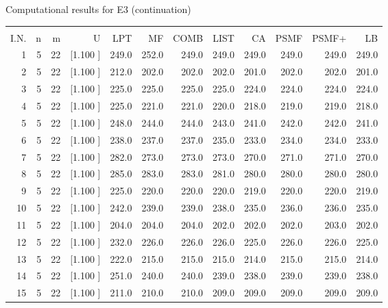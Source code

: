 \documentclass[12pt,a4paper]{article}
\begin{document}
\newpage
\begin{center}
 Computational results for E3 (continuation) {\tiny
\begin{tabular}{r r r r r r r r r r r r}\hline
    &   &   &          &        &        &        &        &        &        &        &       \\[-0.1in]
  I.N.  &  n  &  m  &  U  &  LPT  &  MF  &  COMB  &  LIST  &  CA  & PSMF &PSMF+ & LB \\[0.03in]
\hline
   1&  5& 22&[1.100     ]&   249.0&   252.0&   249.0&   249.0&   249.0&   249.0&   249.0&   249.0\\[-0.02in]
   2&  5& 22&[1.100     ]&   212.0&   202.0&   202.0&   202.0&   201.0&   202.0&   202.0&   201.0\\[-0.02in]
   3&  5& 22&[1.100     ]&   225.0&   225.0&   225.0&   225.0&   224.0&   224.0&   224.0&   224.0\\[-0.02in]
   4&  5& 22&[1.100     ]&   225.0&   221.0&   221.0&   220.0&   218.0&   219.0&   219.0&   218.0\\[-0.02in]
   5&  5& 22&[1.100     ]&   248.0&   244.0&   244.0&   243.0&   241.0&   242.0&   242.0&   241.0\\[-0.02in]
   6&  5& 22&[1.100     ]&   238.0&   237.0&   237.0&   235.0&   233.0&   234.0&   234.0&   233.0\\[-0.02in]
   7&  5& 22&[1.100     ]&   282.0&   273.0&   273.0&   273.0&   270.0&   271.0&   271.0&   270.0\\[-0.02in]
   8&  5& 22&[1.100     ]&   285.0&   283.0&   283.0&   281.0&   280.0&   280.0&   280.0&   280.0\\[-0.02in]
   9&  5& 22&[1.100     ]&   225.0&   220.0&   220.0&   220.0&   219.0&   220.0&   220.0&   219.0\\[-0.02in]
  10&  5& 22&[1.100     ]&   242.0&   239.0&   239.0&   238.0&   235.0&   236.0&   236.0&   235.0\\[-0.02in]
  11&  5& 22&[1.100     ]&   204.0&   204.0&   204.0&   202.0&   202.0&   202.0&   203.0&   202.0\\[-0.02in]
  12&  5& 22&[1.100     ]&   232.0&   226.0&   226.0&   226.0&   225.0&   226.0&   226.0&   225.0\\[-0.02in]
  13&  5& 22&[1.100     ]&   222.0&   215.0&   215.0&   215.0&   214.0&   215.0&   215.0&   214.0\\[-0.02in]
  14&  5& 22&[1.100     ]&   251.0&   240.0&   240.0&   239.0&   238.0&   239.0&   239.0&   238.0\\[-0.02in]
  15&  5& 22&[1.100     ]&   211.0&   210.0&   210.0&   209.0&   209.0&   209.0&   209.0&   209.0\\[-0.02in]

\end{tabular}}
\end{center}
\end{document}
